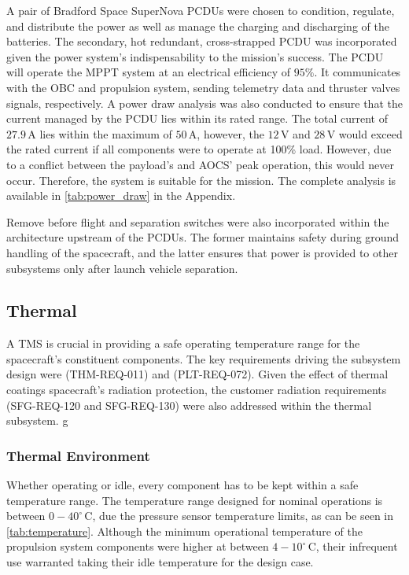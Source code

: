 \documentclass[a4paper, 11pt, conference]{IEEEtran}
\begin{document}
A pair of Bradford Space SuperNova PCDUs \cite{BradfordSupernova2024} were chosen to condition, regulate, and distribute the power as well as manage the charging and discharging of the batteries. The secondary, hot redundant, cross-strapped PCDU was incorporated given the power system’s indispensability to the mission’s success. The PCDU will operate the MPPT system at an electrical efficiency of $95\%$. It communicates with the OBC and propulsion system, sending telemetry data and thruster valves signals, respectively. A power draw analysis was also conducted to ensure that the current managed by the PCDU lies within its rated range. The total current of $27.9\,\mathrm{A}$ lies within the maximum of $50\,\mathrm{A}$, however, the $12\,\mathrm{V}$ and $28\,\mathrm{V}$ would exceed the rated current if all components were to operate at 100\% load. However, due to a conflict between the payload's and AOCS' peak operation, this would never occur. Therefore, the system is suitable for the mission. The complete analysis is available in \autoref{tab:power_draw} in the Appendix.

Remove before flight and separation switches were also incorporated within the architecture upstream of the PCDUs. The former maintains safety during ground handling of the spacecraft, and the latter ensures that power is provided to other subsystems only after launch vehicle separation.

\subsection{Thermal}
A TMS is crucial in providing a safe operating temperature range for the spacecraft's constituent components.  The key requirements driving the subsystem design were (THM-REQ-011) and (PLT-REQ-072). Given the effect of thermal coatings spacecraft’s radiation protection, the customer radiation requirements (SFG-REQ-120 and SFG-REQ-130) were also addressed within the thermal subsystem.
g
\subsubsection{Thermal Environment}
Whether operating or idle, every component has to be kept within a safe temperature range. The temperature range designed for nominal operations is between $0-40^\circ\,\mathrm{C}$, due the pressure sensor temperature limits, as can be seen in \autoref{tab:temperature}. Although the minimum operational temperature of the propulsion system components were higher at between $4-10^\circ\,\mathrm{C}$, their infrequent use warranted taking their idle temperature for the design case. 
\end{document}
